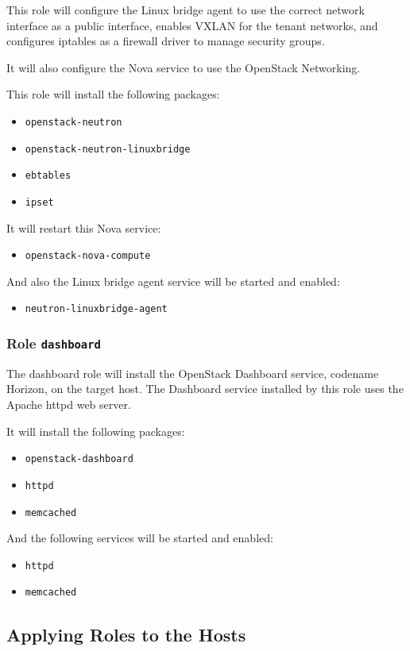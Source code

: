 This role will configure the Linux bridge agent to use the correct network interface as a public interface, enables VXLAN for the tenant networks, and configures iptables as a firewall driver to manage security groups.

It will also configure the Nova service to use the OpenStack Networking.

This role will install the following packages:
\begin{itemize}
  \item{\texttt{openstack-neutron}}
  \item{\texttt{openstack-neutron-linuxbridge}}
  \item{\texttt{ebtables}}
  \item{\texttt{ipset}}
\end{itemize}
It will restart this Nova service:
\begin{itemize}
  \item{\texttt{openstack-nova-compute}}
\end{itemize}
And also the Linux bridge agent service will be started and enabled:
\begin{itemize}
  \item{\texttt{neutron-linuxbridge-agent}}
\end{itemize}


\subsubsection*{Role \texttt{dashboard}}
The dashboard role will install the OpenStack Dashboard service, codename Horizon, on the target host. The Dashboard service installed by this role uses the Apache httpd web server.

It will install the following packages:
\begin{itemize}
  \item{\texttt{openstack-dashboard}}
  \item{\texttt{httpd}}
  \item{\texttt{memcached}}
\end{itemize}
And the following services will be started and enabled:
\begin{itemize}
  \item{\texttt{httpd}}
  \item{\texttt{memcached}}
\end{itemize}




\subsection{Applying Roles to the Hosts}

